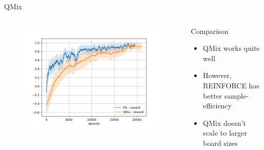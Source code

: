 \documentclass{beamer}
\begin{document}
\begin{frame}{QMix}
\begin{columns}
\begin{figure}[htp]
    \centering
    \includegraphics[width=\textwidth]{images/experiment6/qmix_vs_pg_win_9.png}
\end{figure}
\begin{block}{Comparison}
\begin{itemize}
    \item QMix works quite well
    \item However, REINFORCE has better sample-efficiency
    \item QMix doesn't scale to larger board sizes
\end{itemize}
\end{block}
\end{columns}
\end{frame}
\end{document}
